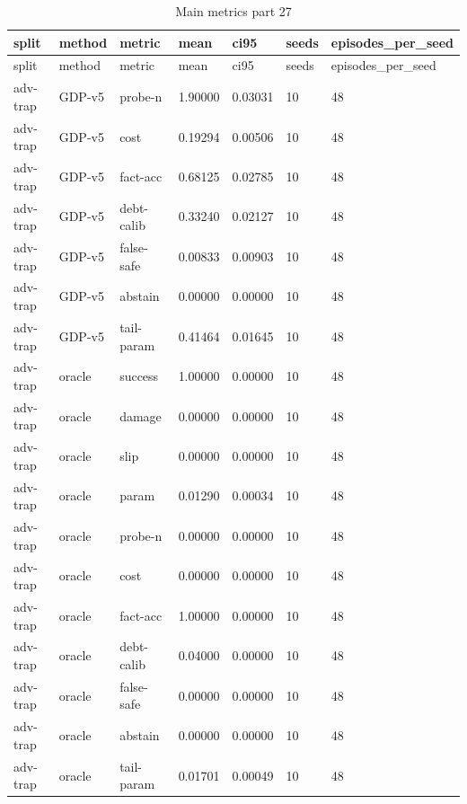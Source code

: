 \documentclass{article}
\begin{document}
\begin{center}
\tiny
\renewcommand{\arraystretch}{0.92}
\setlength{\tabcolsep}{3pt}
\begin{longtable}{lllllll}
\caption{Main metrics part 27}\label{tab:main-metrics-27}\\
\toprule
split & method & metric & mean & ci95 & seeds & episodes\_per\_seed \\
\midrule
\endfirsthead
\toprule
split & method & metric & mean & ci95 & seeds & episodes\_per\_seed \\
\midrule
\endhead
adv-trap & GDP-v5 & probe-n & 1.90000 & 0.03031 & 10 & 48 \\
adv-trap & GDP-v5 & cost & 0.19294 & 0.00506 & 10 & 48 \\
adv-trap & GDP-v5 & fact-acc & 0.68125 & 0.02785 & 10 & 48 \\
adv-trap & GDP-v5 & debt-calib & 0.33240 & 0.02127 & 10 & 48 \\
adv-trap & GDP-v5 & false-safe & 0.00833 & 0.00903 & 10 & 48 \\
adv-trap & GDP-v5 & abstain & 0.00000 & 0.00000 & 10 & 48 \\
adv-trap & GDP-v5 & tail-param & 0.41464 & 0.01645 & 10 & 48 \\
adv-trap & oracle & success & 1.00000 & 0.00000 & 10 & 48 \\
adv-trap & oracle & damage & 0.00000 & 0.00000 & 10 & 48 \\
adv-trap & oracle & slip & 0.00000 & 0.00000 & 10 & 48 \\
adv-trap & oracle & param & 0.01290 & 0.00034 & 10 & 48 \\
adv-trap & oracle & probe-n & 0.00000 & 0.00000 & 10 & 48 \\
adv-trap & oracle & cost & 0.00000 & 0.00000 & 10 & 48 \\
adv-trap & oracle & fact-acc & 1.00000 & 0.00000 & 10 & 48 \\
adv-trap & oracle & debt-calib & 0.04000 & 0.00000 & 10 & 48 \\
adv-trap & oracle & false-safe & 0.00000 & 0.00000 & 10 & 48 \\
adv-trap & oracle & abstain & 0.00000 & 0.00000 & 10 & 48 \\
adv-trap & oracle & tail-param & 0.01701 & 0.00049 & 10 & 48 \\
\bottomrule
\end{longtable}
\renewcommand{\arraystretch}{1.0}
\end{center}

\clearpage
\end{document}
